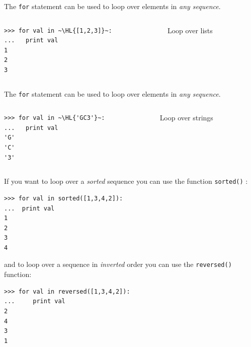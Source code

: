 \documentclass[english,serif,mathserif,xcolor=pdftex,dvipsnames,table]{beamer}
\begin{document}
\begin{frame}[fragile]
  The \texttt{for} statement can be used to loop over elements in \emph{any sequence}.

  \+
  \begin{columns}[c]
    \begin{column}{0.5\textwidth}
\begin{lstlisting}
>>> for val in ~\HL{[1,2,3]}~:
...   print val
1
2
3
\end{lstlisting}
    \end{column}
    \begin{column}{0.4\textwidth}
      \raggedleft
      Loop over lists
    \end{column}
  \end{columns}
\end{frame}


\begin{frame}[fragile]
  The \texttt{for} statement can be used to loop over elements in \emph{any sequence}.

  \+
  \begin{columns}[c]
    \begin{column}{0.5\textwidth}
\begin{lstlisting}
>>> for val in ~\HL{'GC3'}~:
...   print val
'G'
'C'
'3'
\end{lstlisting}
    \end{column}
    \begin{column}{0.4\textwidth}
      \raggedleft
      Loop over strings
    \end{column}
  \end{columns}
\end{frame}

\begin{frame}[fragile]

  If you want to loop over a \textit{sorted} sequence you can use the
  function \texttt{sorted()} :

  \begin{lstlisting}
>>> for val in sorted([1,3,4,2]):
...  print val
1
2
3
4
  \end{lstlisting}

and to loop over a sequence in \textit{inverted} order you can use the
\texttt{reversed()} function:

\begin{lstlisting}
>>> for val in reversed([1,3,4,2]):
...     print val
2
4
3
1
\end{lstlisting}

\end{frame}
\end{document}
